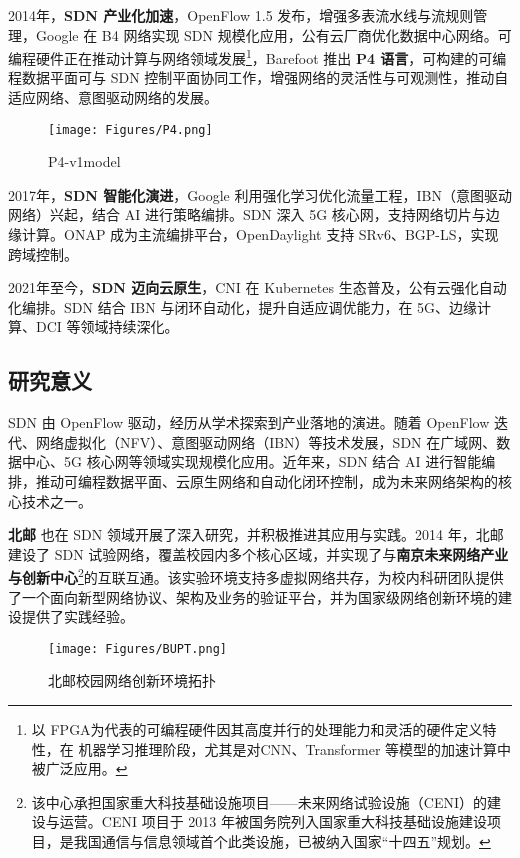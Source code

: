 \documentclass{article}
\begin{document}
2014年，\textbf{SDN 产业化加速}，OpenFlow 1.5 发布，增强多表流水线与流规则管理，Google 在 B4 网络实现 SDN 规模化应用，公有云厂商优化数据中心网络。可编程硬件正在推动计算与网络领域发展\footnote{以 FPGA为代表的可编程硬件因其高度并行的处理能力和灵活的硬件定义特性，在 机器学习推理阶段，尤其是对CNN、Transformer 等模型的加速计算中被广泛应用。}，Barefoot 推出 \textbf{P4 语言}，可构建的可编程数据平面可与 SDN 控制平面协同工作，增强网络的灵活性与可观测性，推动自适应网络、意图驱动网络的发展。
\begin{figure}[h]
    \centering
    \texttt{[image: Figures/P4.png]}
    \caption{P4-v1model\cite{p4spec}}
\end{figure}



2017年，\textbf{SDN 智能化演进}，Google 利用强化学习优化流量工程，IBN（意图驱动网络）兴起，结合 AI 进行策略编排。SDN 深入 5G 核心网，支持网络切片与边缘计算。ONAP 成为主流编排平台，OpenDaylight 支持 SRv6、BGP-LS，实现跨域控制。


2021年至今，\textbf{SDN 迈向云原生}，CNI 在 Kubernetes 生态普及，公有云强化自动化编排。SDN 结合 IBN 与闭环自动化，提升自适应调优能力，在 5G、边缘计算、DCI 等领域持续深化。



\subsection{\textbf{研究意义}}

\quad\quad SDN 由 OpenFlow 驱动，经历从学术探索到产业落地的演进。随着 OpenFlow 迭代、网络虚拟化（NFV）、意图驱动网络（IBN）等技术发展，SDN 在广域网、数据中心、5G 核心网等领域实现规模化应用。近年来，SDN 结合 AI 进行智能编排，推动可编程数据平面、云原生网络和自动化闭环控制，成为未来网络架构的核心技术之一。


\textbf{北邮} 也在 SDN 领域开展了深入研究，并积极推进其应用与实践。2014 年，北邮建设了 SDN 试验网络\cite{bupt2013}，覆盖校园内多个核心区域，并实现了与\textbf{南京未来网络产业与创新中心}\footnote{该中心承担国家重大科技基础设施项目——未来网络试验设施（CENI）的建设与运营。CENI 项目于 2013 年被国务院列入国家重大科技基础设施建设项目，是我国通信与信息领域首个此类设施，已被纳入国家“十四五”规划。}的互联互通。该实验环境支持多虚拟网络共存，为校内科研团队提供了一个面向新型网络协议、架构及业务的验证平台，并为国家级网络创新环境的建设提供了实践经验。

\begin{figure}[h]
    \centering
    \texttt{[image: Figures/BUPT.png]}
    \caption{北邮校园网络创新环境拓扑}
\end{figure}
\end{document}
